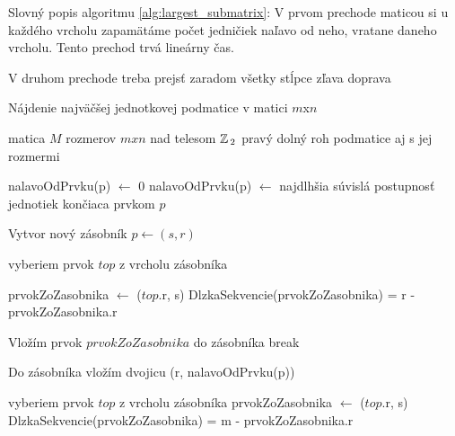 Slovný popis algoritmu \ref{alg:largest_submatrix}: 
V prvom prechode maticou si u každého vrcholu zapamätáme počet jedničiek naľavo od neho, vratane daneho vrcholu. 
Tento prechod trvá lineárny čas.

V druhom prechode treba prejsť zaradom všetky stĺpce zľava doprava



\begin{algorithm}
\caption{Nájdenie najväčšej jednotkovej podmatice v matici  $m$x$n$}
\label{alg:largest_submatrix}
\begin{algorithmic}[1] %
\REQUIRE matica $M$ rozmerov $m x n$ nad telesom $\mathbb{Z}\,_2$
\ENSURE pravý dolný roh podmatice aj s jej rozmermi


		\STATE nalavoOdPrvku(p) $\leftarrow$ 0
	\ELSE
		\STATE nalavoOdPrvku(p) $\leftarrow$ najdlhšia súvislá postupnosť jednotiek končiaca prvkom $p$
	\ENDIF	
\ENDFOR

	\STATE Vytvor nový zásobník
		\STATE $p \leftarrow (s, r)$
		
			\STATE vyberiem prvok $top$ z vrcholu zásobníka
						
				\STATE prvokZoZasobnika $\leftarrow$ ($top$.r, s)
				\STATE DlzkaSekvencie(prvokZoZasobnika) = r - prvokZoZasobnika.r
			
			\ELSE
				\STATE Vložím prvok $prvokZoZasobnika$ do zásobníka
				\STATE break
			\ENDIF
		\ENDWHILE
		
		\STATE Do zásobníka vložím dvojicu (r, nalavoOdPrvku(p))
	\ENDFOR
	
		\STATE vyberiem prvok $top$ z vrcholu zásobníka
		\STATE prvokZoZasobnika $\leftarrow$ ($top$.r, s)
		\STATE DlzkaSekvencie(prvokZoZasobnika) = m - prvokZoZasobnika.r
		
	\ENDWHILE
\ENDFOR




\end{algorithmic}
\end{algorithm}

